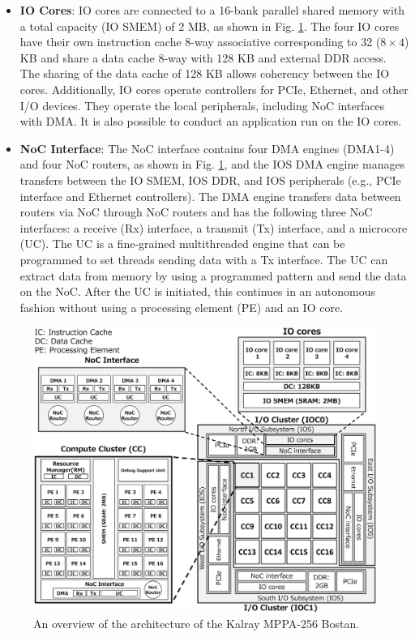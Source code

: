 \begin{itemize}
  \setlength{\leftskip}{-5mm}    
  \item \textbf{IO Cores}: IO cores are connected to a 16-bank parallel shared memory with a total capacity (IO SMEM) of 2 MB, as shown in Fig. \ref{fig:mppa_architecture}.
  The four IO cores have their own instruction cache 8-way associative corresponding to 32 ($8 \times 4$) KB and share a data cache 8-way with 128 KB and external DDR access.
  The sharing of the data cache of 128 KB allows coherency between the IO cores.
  Additionally, IO cores operate controllers for PCIe, Ethernet, and other I/O devices.
  They operate the local peripherals, including NoC interfaces with DMA.
  It is also possible to conduct an application run on the IO cores.
  
  \item \textbf{NoC Interface}: The NoC interface contains four DMA engines (DMA1-4) and four NoC routers, as shown in Fig. \ref{fig:mppa_architecture}, and the IOS DMA engine manages transfers between the IO SMEM, IOS DDR, and IOS peripherals (e.g., PCIe interface and Ethernet controllers).
  The DMA engine transfers data between routers via NoC through NoC routers and has the following three NoC interfaces: a receive (Rx) interface, a transmit (Tx) interface, and a microcore (UC).
  The UC is a fine-grained multithreaded engine that can be programmed to set threads sending data with a Tx interface.
  The UC can extract data from memory by using a programmed pattern and send the data on the NoC.
  After the UC is initiated, this continues in an autonomous fashion without using a processing element (PE) and an IO core.
\end{itemize}
\begin{figure}[!htbp]
  \centering
  \includegraphics[width=0.9\linewidth]{../figure/mppa_architecture.eps}
      \caption{\label{fig:mppa_architecture}
    An overview of the architecture of the Kalray MPPA-256 Bostan.}
  \end{figure}

